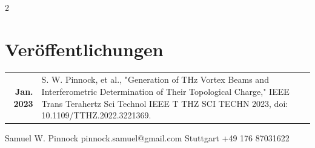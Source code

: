 \documentclass[pastel]{simplehipstercv}
\newlength{\rightcolwidth}
\begin{document}
\begin{paracol}{2}
\section*{Veröffentlichungen}
\begin{tabular}{>{\footnotesize\bfseries}r >{\footnotesize}p{}}
    Jan. 2023 & S. W. Pinnock, et al., "Generation of THz Vortex Beams and Interferometric Determination of Their Topological Charge," IEEE Trans Terahertz Sci Technol IEEE T THZ SCI TECHN 2023, doi: 10.1109/TTHZ.2022.3221369. \\
\end{tabular}



\vspace{3.85cm}

\setlength{\parindent}{0pt}
\begin{minipage}[t]{\rightcolwidth}
\begin{center}\fontfamily{\sfdefault}\selectfont \color{black!70}
{\small Samuel W. Pinnock  pinnock.samuel@gmail.com  Stuttgart  +49 176 87031622
}
\end{center}
\end{minipage}

\end{paracol}
\end{document}
